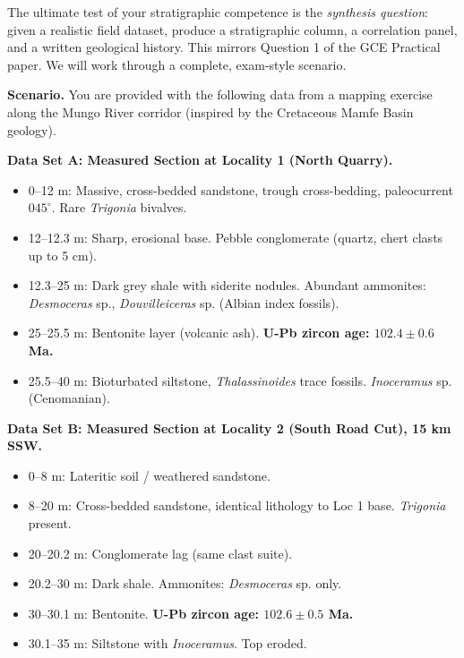 \documentclass[11pt]{article}
\begin{document}
The ultimate test of your stratigraphic competence is the \emph{synthesis question}: given a realistic field dataset, produce a stratigraphic column, a correlation panel, and a written geological history. This mirrors Question 1 of the GCE Practical paper. We will work through a complete, exam-style scenario.

\begin{experience}
\textbf{Scenario.} You are provided with the following data from a mapping exercise along the Mungo River corridor (inspired by the Cretaceous Mamfe Basin geology).

\textbf{Data Set A: Measured Section at Locality 1 (North Quarry).}
\begin{itemize}
    \item 0--12 m: Massive, cross-bedded sandstone, trough cross-bedding, paleocurrent $045^\circ$. Rare \emph{Trigonia} bivalves.
    \item 12--12.3 m: Sharp, erosional base. Pebble conglomerate (quartz, chert clasts up to 5 cm).
    \item 12.3--25 m: Dark grey shale with siderite nodules. Abundant ammonites: \emph{Desmoceras} sp., \emph{Douvilleiceras} sp. (Albian index fossils).
    \item 25--25.5 m: Bentonite layer (volcanic ash). \textbf{U-Pb zircon age: $102.4 \pm 0.6$ Ma.}
    \item 25.5--40 m: Bioturbated siltstone, \emph{Thalassinoides} trace fossils. \emph{Inoceramus} sp. (Cenomanian).
\end{itemize}

\textbf{Data Set B: Measured Section at Locality 2 (South Road Cut), 15 km SSW.}
\begin{itemize}
    \item 0--8 m: Lateritic soil / weathered sandstone.
    \item 8--20 m: Cross-bedded sandstone, identical lithology to Loc 1 base. \emph{Trigonia} present.
    \item 20--20.2 m: Conglomerate lag (same clast suite).
    \item 20.2--30 m: Dark shale. Ammonites: \emph{Desmoceras} sp. only.
    \item 30--30.1 m: Bentonite. \textbf{U-Pb zircon age: $102.6 \pm 0.5$ Ma.}
    \item 30.1--35 m: Siltstone with \emph{Inoceramus}. Top eroded.
\end{itemize}


\end{experience}
\end{document}
